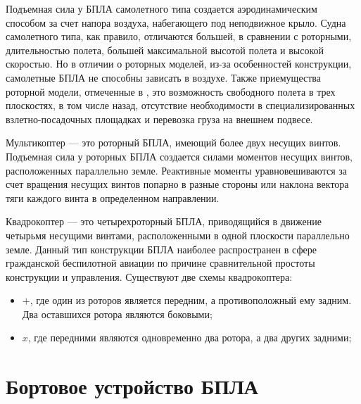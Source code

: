 \documentclass[pract, och, master]{SCWorks}
\begin{document}
Подъемная сила у БПЛА самолетного типа создается  аэродинамическим способом за счет напора воздуха, набегающего под неподвижное крыло. 
Судна самолетного типа, как правило, отличаются большей, в сравнении с роторными, длительностью полета, большей максимальной высотой полета и высокой скоростью. 
Но в отличии о роторных моделей, из-за особенностей конструкции, самолетные БПЛА не способны зависать в воздухе. Также приемущества роторной модели, 
отмеченные в \cite{}, это возможность свободного полета в трех плоскостях, в том числе назад, отсутствие необходимости в специализированных 
взлетно-посадочных площадках и перевозка груза на внешнем подвесе.

Мультикоптер --- это роторный БПЛА, имеющий более двух несущих винтов. Подъемная сила у роторных БПЛА создается силами моментов 
несущих винтов, расположенных параллельно земле. Реактивные моменты уравновешиваются за счет вращения несущих винтов попарно в разные стороны или наклона вектора 
тяги каждого винта в определенном направлении.

Квадрокоптер --- это четырехроторный БПЛА, приводящийся в движение четырьмя несущими винтами, расположенными в одной плоскости параллельно земле. 
Данный тип конструкции БПЛА  наиболее распространен в сфере гражданской беспилотной авиации по причине сравнительной простоты конструкции и управления.
Существуют две схемы квадрокоптера: 
\begin{itemize}
	\item $+$, где один из роторов является передним, а противоположный ему задним. Два оставшихся ротора являются боковыми;
	\item $x$, где передними являются одновременно два ротора, а два других задними;
\end{itemize}



\section*{Бортовое устройство БПЛА}
\end{document}
